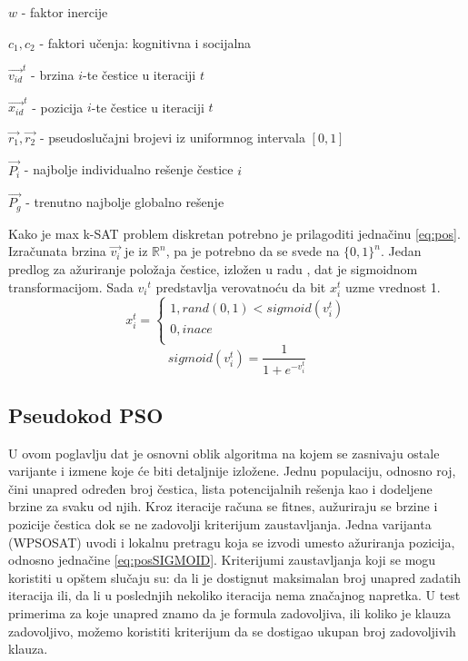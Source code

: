 \documentclass{article}
\begin{document}
\begin{list}{•}{}
	\item $w$ - faktor inercije
	\item $c_1, c_2$ - faktori učenja: kognitivna i socijalna
	\item $\vec{v_{id}}^{t}$ - brzina $i$-te čestice u iteraciji $t$ 
	\item $\vec{x_{id}}^{t}$ - pozicija $i$-te čestice u iteraciji $t$ 
	\item $\vec{r_1}, \vec{r_2}$ - pseudoslučajni brojevi iz uniformnog intervala $[0,1]$
	\item $\vec{P_i}$ - najbolje individualno rešenje čestice $i$
	\item $\vec{P_g}$ - trenutno najbolje globalno rešenje\\ 
\end{list}

Kako je max k-SAT problem diskretan potrebno je prilagoditi jednačinu \ref{eq:pos}. Izračunata brzina $\vec{v_{i}}$ je iz $\mathbb{R}^n$, pa je potrebno da se svede na $\{ 0,1 \}^n$. Jedan predlog za ažuriranje položaja čestice, izložen u radu \cite{sigmoid}, dat je sigmoidnom transformacijom. Sada ${v_{i}}^{t}$ predstavlja verovatnoću da bit $x_{i}^{t}$ uzme vrednost 1.  \\

\begin{equation}\label{eq:posSIGMOID}
x_{i}^{t}=\begin{cases}
               1, rand(0,1) < sigmoid(v_{i}^{t})\\
               0, inace\\
            \end{cases}
\end{equation}\label{eq:sigmoid}
\begin{equation}
sigmoid(v_{i}^{t}) = \frac{1}{1+e^{-v_{i}^{t}}}
\end{equation}
 
 
\subsection{Pseudokod PSO}
\label{sec:pso_pseudokod}
U ovom poglavlju dat je osnovni oblik algoritma na kojem se zasnivaju ostale varijante i izmene koje će biti detaljnije izložene. Jednu populaciju, odnosno roj, čini unapred određen broj čestica, lista potencijalnih rešenja kao i dodeljene brzine za svaku od njih. 
Kroz iteracije računa se fitnes, aužuriraju se brzine i pozicije čestica dok se ne zadovolji kriterijum zaustavljanja. 
Jedna varijanta (WPSOSAT) uvodi i lokalnu pretragu koja se izvodi umesto ažuriranja pozicija, odnosno jednačine \ref{eq:posSIGMOID}.
Kriterijumi zaustavljanja koji se mogu koristiti u opštem slučaju su: da li je dostignut maksimalan broj unapred zadatih iteracija ili, da li u poslednjih nekoliko iteracija nema značajnog napretka.
U test primerima za koje unapred znamo da je formula zadovoljiva, ili koliko je klauza zadovoljivo, možemo koristiti kriterijum da se dostigao ukupan broj zadovoljivih klauza. \\
\end{document}
